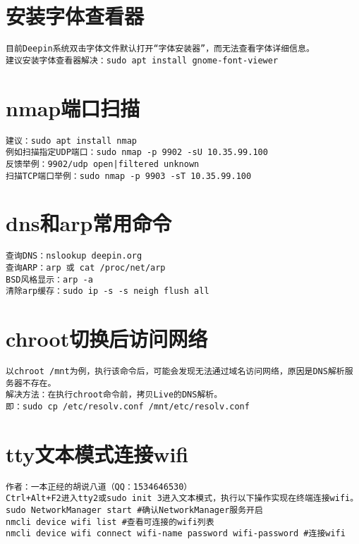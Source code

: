 \documentclass[a4paper,fontset=fandol,zihao=-4,linespread=1.2,oneside]{ctexbook}
\begin{document}
\section{安装字体查看器}
\begin{lstlisting}
目前Deepin系统双击字体文件默认打开“字体安装器”，而无法查看字体详细信息。
建议安装字体查看器解决：sudo apt install gnome-font-viewer
\end{lstlisting}

\section{nmap端口扫描}
\begin{lstlisting}
建议：sudo apt install nmap
例如扫描指定UDP端口：sudo nmap -p 9902 -sU 10.35.99.100
反馈举例：9902/udp open|filtered unknown
扫描TCP端口举例：sudo nmap -p 9903 -sT 10.35.99.100
\end{lstlisting}

\section{dns和arp常用命令}
\begin{lstlisting}
查询DNS：nslookup deepin.org
查询ARP：arp 或 cat /proc/net/arp
BSD风格显示：arp -a
清除arp缓存：sudo ip -s -s neigh flush all
\end{lstlisting}

\section{chroot切换后访问网络}
\begin{lstlisting}
以chroot /mnt为例，执行该命令后，可能会发现无法通过域名访问网络，原因是DNS解析服务器不存在。
解决方法：在执行chroot命令前，拷贝Live的DNS解析。
即：sudo cp /etc/resolv.conf /mnt/etc/resolv.conf
\end{lstlisting}

\section{tty文本模式连接wifi}
\begin{lstlisting}
作者：一本正经的胡说八道（QQ：1534646530）
Ctrl+Alt+F2进入tty2或sudo init 3进入文本模式，执行以下操作实现在终端连接wifi。
sudo NetworkManager start #确认NetworkManager服务开启
nmcli device wifi list #查看可连接的wifi列表
nmcli device wifi connect wifi-name password wifi-password #连接wifi
\end{lstlisting}
\end{document}
